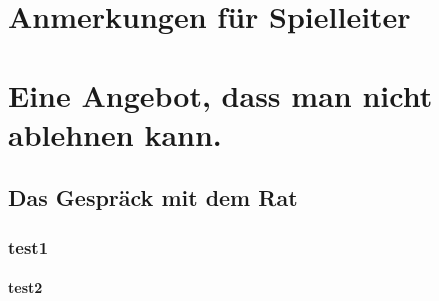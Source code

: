 \documentclass{include/pnp}
\begin{document}
	\FrontMatter

	

	\chapter*{Anmerkungen für Spielleiter}
	
	
	
	\lipsum[1-12]

	\MainMatter

	
	\TableOfContents

	\chapter[Im Ratshaus]{Eine Angebot, dass man nicht ablehnen kann.}
	\section{Das Gespräck mit dem Rat}
	\lipsum[1-12]
	\subsection{test1}
	\subsubsection{test2}
	\lipsum[1]

	\BackMatter

	
\end{document}
